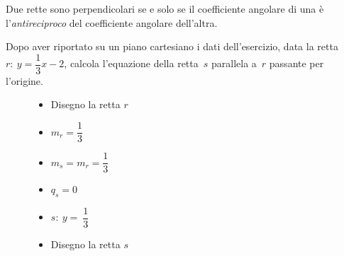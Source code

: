 \begin{definizione}
Due rette sono perpendicolari se e solo se il coefficiente angolare di 
una è l'\emph{antireciproco} del coefficiente angolare dell'altra.
\end{definizione}

 \begin{esempio}
Dopo aver riportato su un piano cartesiano i dati dell'esercizio,
data la retta~\(r:~y = \dfrac{1}{3} x-2\), calcola l'equazione della 
retta~\(s\) parallela a~\(r\) passante per l'origine.

\begin{inaccessibleblock}
 \begin{figure}[h]
\centering \hspace{-5mm}
 \begin{minipage}[]{.40\textwidth}
  \begin{itemize}
  \item Disegno la retta \(r\)
  \item \(m_r = \dfrac{1}{3}\)
  \item \(m_s = m_r = \dfrac{1}{3}\)
  \item \(q_s = 0\)
  \item \(s:~ y=~\dfrac{1}{3}\)
  \item Disegno la retta \(s\)
  \end{itemize}
 \end{minipage}
 \begin{minipage}[]{.60\textwidth}
   \centering \esempioparall
 \end{minipage}
\label{fig:esempioparall}
\end{figure}
\end{inaccessibleblock}
 \end{esempio}
 
